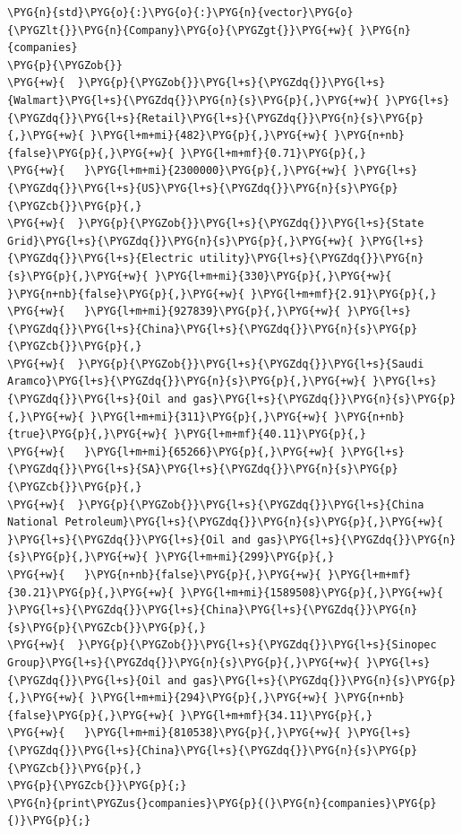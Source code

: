 \begin{codeblockbg}
\begin{Verbatim}[commandchars=\\\{\},breaklines=true,breakanywhere=true,fontsize=\codefont,xleftmargin=17bp]
\PYG{n}{std}\PYG{o}{:}\PYG{o}{:}\PYG{n}{vector}\PYG{o}{\PYGZlt{}}\PYG{n}{Company}\PYG{o}{\PYGZgt{}}\PYG{+w}{ }\PYG{n}{companies}
\PYG{p}{\PYGZob{}}
\PYG{+w}{  }\PYG{p}{\PYGZob{}}\PYG{l+s}{\PYGZdq{}}\PYG{l+s}{Walmart}\PYG{l+s}{\PYGZdq{}}\PYG{n}{s}\PYG{p}{,}\PYG{+w}{ }\PYG{l+s}{\PYGZdq{}}\PYG{l+s}{Retail}\PYG{l+s}{\PYGZdq{}}\PYG{n}{s}\PYG{p}{,}\PYG{+w}{ }\PYG{l+m+mi}{482}\PYG{p}{,}\PYG{+w}{ }\PYG{n+nb}{false}\PYG{p}{,}\PYG{+w}{ }\PYG{l+m+mf}{0.71}\PYG{p}{,}
\PYG{+w}{   }\PYG{l+m+mi}{2300000}\PYG{p}{,}\PYG{+w}{ }\PYG{l+s}{\PYGZdq{}}\PYG{l+s}{US}\PYG{l+s}{\PYGZdq{}}\PYG{n}{s}\PYG{p}{\PYGZcb{}}\PYG{p}{,}
\PYG{+w}{  }\PYG{p}{\PYGZob{}}\PYG{l+s}{\PYGZdq{}}\PYG{l+s}{State Grid}\PYG{l+s}{\PYGZdq{}}\PYG{n}{s}\PYG{p}{,}\PYG{+w}{ }\PYG{l+s}{\PYGZdq{}}\PYG{l+s}{Electric utility}\PYG{l+s}{\PYGZdq{}}\PYG{n}{s}\PYG{p}{,}\PYG{+w}{ }\PYG{l+m+mi}{330}\PYG{p}{,}\PYG{+w}{ }\PYG{n+nb}{false}\PYG{p}{,}\PYG{+w}{ }\PYG{l+m+mf}{2.91}\PYG{p}{,}
\PYG{+w}{   }\PYG{l+m+mi}{927839}\PYG{p}{,}\PYG{+w}{ }\PYG{l+s}{\PYGZdq{}}\PYG{l+s}{China}\PYG{l+s}{\PYGZdq{}}\PYG{n}{s}\PYG{p}{\PYGZcb{}}\PYG{p}{,}
\PYG{+w}{  }\PYG{p}{\PYGZob{}}\PYG{l+s}{\PYGZdq{}}\PYG{l+s}{Saudi Aramco}\PYG{l+s}{\PYGZdq{}}\PYG{n}{s}\PYG{p}{,}\PYG{+w}{ }\PYG{l+s}{\PYGZdq{}}\PYG{l+s}{Oil and gas}\PYG{l+s}{\PYGZdq{}}\PYG{n}{s}\PYG{p}{,}\PYG{+w}{ }\PYG{l+m+mi}{311}\PYG{p}{,}\PYG{+w}{ }\PYG{n+nb}{true}\PYG{p}{,}\PYG{+w}{ }\PYG{l+m+mf}{40.11}\PYG{p}{,}
\PYG{+w}{   }\PYG{l+m+mi}{65266}\PYG{p}{,}\PYG{+w}{ }\PYG{l+s}{\PYGZdq{}}\PYG{l+s}{SA}\PYG{l+s}{\PYGZdq{}}\PYG{n}{s}\PYG{p}{\PYGZcb{}}\PYG{p}{,}
\PYG{+w}{  }\PYG{p}{\PYGZob{}}\PYG{l+s}{\PYGZdq{}}\PYG{l+s}{China National Petroleum}\PYG{l+s}{\PYGZdq{}}\PYG{n}{s}\PYG{p}{,}\PYG{+w}{ }\PYG{l+s}{\PYGZdq{}}\PYG{l+s}{Oil and gas}\PYG{l+s}{\PYGZdq{}}\PYG{n}{s}\PYG{p}{,}\PYG{+w}{ }\PYG{l+m+mi}{299}\PYG{p}{,}
\PYG{+w}{   }\PYG{n+nb}{false}\PYG{p}{,}\PYG{+w}{ }\PYG{l+m+mf}{30.21}\PYG{p}{,}\PYG{+w}{ }\PYG{l+m+mi}{1589508}\PYG{p}{,}\PYG{+w}{ }\PYG{l+s}{\PYGZdq{}}\PYG{l+s}{China}\PYG{l+s}{\PYGZdq{}}\PYG{n}{s}\PYG{p}{\PYGZcb{}}\PYG{p}{,}
\PYG{+w}{  }\PYG{p}{\PYGZob{}}\PYG{l+s}{\PYGZdq{}}\PYG{l+s}{Sinopec Group}\PYG{l+s}{\PYGZdq{}}\PYG{n}{s}\PYG{p}{,}\PYG{+w}{ }\PYG{l+s}{\PYGZdq{}}\PYG{l+s}{Oil and gas}\PYG{l+s}{\PYGZdq{}}\PYG{n}{s}\PYG{p}{,}\PYG{+w}{ }\PYG{l+m+mi}{294}\PYG{p}{,}\PYG{+w}{ }\PYG{n+nb}{false}\PYG{p}{,}\PYG{+w}{ }\PYG{l+m+mf}{34.11}\PYG{p}{,}
\PYG{+w}{   }\PYG{l+m+mi}{810538}\PYG{p}{,}\PYG{+w}{ }\PYG{l+s}{\PYGZdq{}}\PYG{l+s}{China}\PYG{l+s}{\PYGZdq{}}\PYG{n}{s}\PYG{p}{\PYGZcb{}}\PYG{p}{,}
\PYG{p}{\PYGZcb{}}\PYG{p}{;}
\PYG{n}{print\PYGZus{}companies}\PYG{p}{(}\PYG{n}{companies}\PYG{p}{)}\PYG{p}{;}
\end{Verbatim}
\end{codeblockbg}


